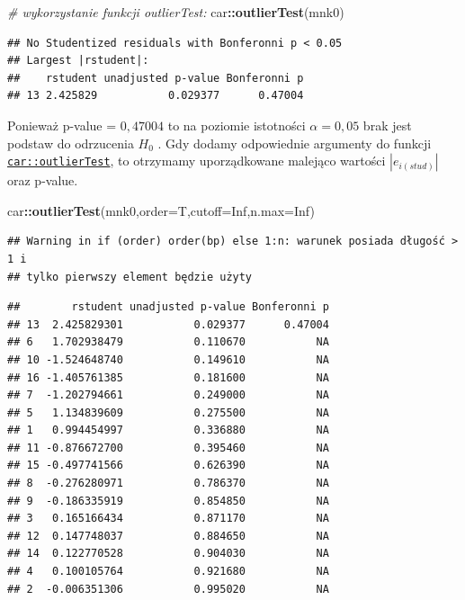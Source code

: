 \documentclass[polish,]{book}
\newenvironment{Shaded}{\begin{snugshade}}{\end{snugshade}}
\newcommand{\CommentTok}[1]{\textcolor[rgb]{0.56,0.35,0.01}{\textit{#1}}}
\newcommand{\DataTypeTok}[1]{\textcolor[rgb]{0.13,0.29,0.53}{#1}}
\newcommand{\KeywordTok}[1]{\textcolor[rgb]{0.13,0.29,0.53}{\textbf{#1}}}
\newcommand{\NormalTok}[1]{#1}
\newcommand{\OperatorTok}[1]{\textcolor[rgb]{0.81,0.36,0.00}{\textbf{#1}}}
\newcommand{\OtherTok}[1]{\textcolor[rgb]{0.56,0.35,0.01}{#1}}
\begin{document}
\begin{Shaded}
\begin{Highlighting}[]
\CommentTok{# wykorzystanie funkcji outlierTest:}
\NormalTok{car}\OperatorTok{::}\KeywordTok{outlierTest}\NormalTok{(mnk0)}
\end{Highlighting}
\end{Shaded}

\begin{verbatim}
## No Studentized residuals with Bonferonni p < 0.05
## Largest |rstudent|:
##    rstudent unadjusted p-value Bonferonni p
## 13 2.425829           0.029377      0.47004
\end{verbatim}

Ponieważ p-value = \(0,47004\) to na poziomie istotności \(\alpha = 0,05\) brak jest podstaw do odrzucenia \(H_0\) . Gdy dodamy odpowiednie argumenty do funkcji \href{https://rdrr.io/cran/car/man/outlierTest.html}{\texttt{car::outlierTest}}, to otrzymamy uporządkowane malejąco wartości \(|e_{i(stud)}|\) oraz p-value.

\begin{Shaded}
\begin{Highlighting}[]
\NormalTok{car}\OperatorTok{::}\KeywordTok{outlierTest}\NormalTok{(mnk0,}\DataTypeTok{order=}\NormalTok{T,}\DataTypeTok{cutoff=}\OtherTok{Inf}\NormalTok{,}\DataTypeTok{n.max=}\OtherTok{Inf}\NormalTok{)}
\end{Highlighting}
\end{Shaded}

\begin{verbatim}
## Warning in if (order) order(bp) else 1:n: warunek posiada długość > 1 i
## tylko pierwszy element będzie użyty
\end{verbatim}

\begin{verbatim}
##        rstudent unadjusted p-value Bonferonni p
## 13  2.425829301           0.029377      0.47004
## 6   1.702938479           0.110670           NA
## 10 -1.524648740           0.149610           NA
## 16 -1.405761385           0.181600           NA
## 7  -1.202794661           0.249000           NA
## 5   1.134839609           0.275500           NA
## 1   0.994454997           0.336880           NA
## 11 -0.876672700           0.395460           NA
## 15 -0.497741566           0.626390           NA
## 8  -0.276280971           0.786370           NA
## 9  -0.186335919           0.854850           NA
## 3   0.165166434           0.871170           NA
## 12  0.147748037           0.884650           NA
## 14  0.122770528           0.904030           NA
## 4   0.100105764           0.921680           NA
## 2  -0.006351306           0.995020           NA
\end{verbatim}
\end{document}
